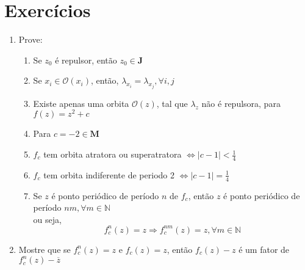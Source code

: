 \section{Exercícios}

\begin{enumerate}
    \item Prove:
        \begin{enumerate}
            \item 
                Se \(z_0\) é repulsor, então \(z_0 \in \mathbf{J}\)
            \item
                Se \(x_i \in \mathcal{O}(x_i)\), então, \(\lambda_{x_i} = \lambda_{x_j}, \forall i,j\)
            \item
                Existe apenas uma orbita \( \mathcal{O}(z)\), tal que \(\lambda_{z}\) não é repulsora, para \(f(z) = z^2 + c \)
            \item 
                Para \( c = -2 \in \mathbf{M} \)
            \item 
                \(f_c \) tem orbita atratora ou superatratora \( \Longleftrightarrow |c-1| < \frac{1}{4}\)
            \item
                \(f_c \) tem orbita indiferente de periodo 2 \( \Longleftrightarrow |c-1| = \frac{1}{4}\)
            \item
                Se \(z\) é ponto periódico de período \(n\) de \(f_c\), então \(z\) é ponto periódico de período \(nm, \forall m \in \mathbb{N} \)
                \\
                ou seja,
                \\
                \[ 
                    f_c^n(z) = z \Longrightarrow f_c^{nm}(z) = z, \forall m \in \mathbb{N} 
                \]
        \end{enumerate}
    \item
        Mostre que se \( f_c^n(z) = z \) e \(f_c(z) = z \), então 
        \(f_c(z) - z \) é um fator de \( f_c^n(z) - \overline{z} \)
        
        
\end{enumerate}